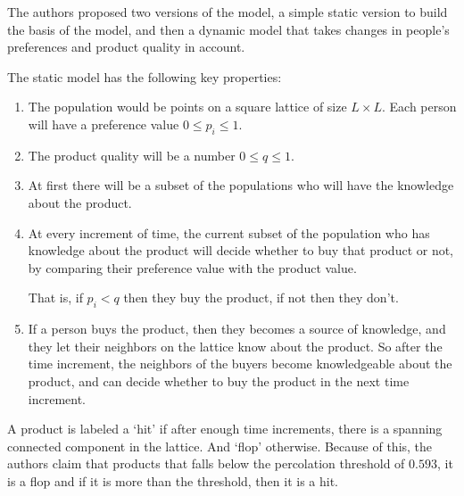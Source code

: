 \documentclass[article, 11pt, a4paper, oneside]{memoir}
\begin{document}
\begin{enumerate}[left=0pt, itemsep=20pt, label={\(\square\)}]
        The authors proposed two versions of the model, a simple static version to build
        the basis of the model, and then a dynamic model that takes changes in people's
        preferences and product quality in account.

        The static model has the following key properties:
        \begin{enumerate}[left=0pt, itemsep=0pt]
            \item The population would be points on a square lattice of size \(L\times
                L\). Each person will have a preference value \(0 \le p_i\le 1\). 
            \item The product quality will be a number \(0 \le q \le 1\).
            \item At first there will be a subset of the populations who will have the
                knowledge about the product. 
            \item At every increment of time, the current subset of the population who has
                knowledge about the product will decide whether to buy that product or
                not, by comparing their preference value with the product value. 

                That is, if \(p_i<q\) then they buy the product, if not then they don't.
            \item If a person buys the product, then they becomes a source of knowledge,
                and they let their neighbors on the lattice know about the product. So
                after the time increment, the neighbors of the buyers become knowledgeable
                about the product, and can decide whether to buy the product in the next
                time increment.
        \end{enumerate}

        A product is labeled a `hit' if after enough time increments, there is a spanning
        connected component in the lattice. And `flop' otherwise. Because of this, the
        authors claim that products that falls below the percolation threshold of 
        \(0.593\), it is a flop and if it is more than the threshold, then it is a hit.


\end{enumerate}
\end{document}
